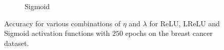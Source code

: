 \documentclass[%
reprint,s
amsmath,amssymb,
aps,
]{revtex4-2}
\begin{document}
\begin{figure}[ht!]
\begin{subfigure}{0.4353\textwidth}
		\caption{Sigmoid}
		\label{fig:Sigmoid_heatmap}
	\end{subfigure}
	\caption{Accuracy for various combinations of $\eta$ and $\lambda$ for ReLU, LReLU and Sigmoid activation functions with $250$ epochs on the breast cancer dataset.}
	\label{fig:FFNN_cancer_heatmaps}
\end{figure}

	
\end{document}
